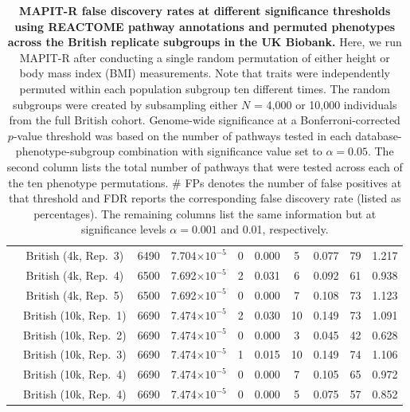\documentclass[10pt]{article}
\begin{document}
\begin{landscape}
\begin{table}[ht]
\begin{tabular}{|c|c|c|ccc|cc|cc|}
  & British (4k, Rep.~3) & 6490 & 7.704$\times 10^{-5}$ & 0 & 0.000 & 5 & 0.077 & 79 & 1.217 \\
  & British (4k, Rep.~4) & 6500 & 7.692$\times 10^{-5}$ & 2 & 0.031 & 6 & 0.092 & 61 & 0.938 \\
  & British (4k, Rep.~5) & 6500 & 7.692$\times 10^{-5}$ & 0 & 0.000 & 7 & 0.108 & 73 & 1.123 \\
  & British (10k, Rep.~1) & 6690 & 7.474$\times 10^{-5}$ & 2 & 0.030 & 10 & 0.149 & 73 & 1.091 \\
  & British (10k, Rep.~2) & 6690 & 7.474$\times 10^{-5}$ & 0 & 0.000 & 3 & 0.045 & 42 & 0.628 \\
  & British (10k, Rep.~3) & 6690 & 7.474$\times 10^{-5}$ & 1 & 0.015 & 10 & 0.149 & 74 & 1.106 \\
  & British (10k, Rep.~4) & 6690 & 7.474$\times 10^{-5}$ & 0 & 0.000 & 7 & 0.105 & 65 & 0.972 \\
  & British (10k, Rep.~4) & 6690 & 7.474$\times 10^{-5}$ & 0 & 0.000 & 5 & 0.075 & 57 & 0.852 \\
    \hline
\end{tabular}
\caption{\textbf{MAPIT-R false discovery rates at different significance thresholds using REACTOME pathway annotations and permuted phenotypes across the British replicate subgroups in the UK Biobank.} Here, we run MAPIT-R after conducting a single random permutation of either height or body mass index (BMI) measurements. Note that traits were independently permuted within each population subgroup ten different times. The random subgroups were created by subsampling either $N$ = 4,000 or 10,000 individuals from the full British cohort. Genome-wide significance at a Bonferroni-corrected $p$-value threshold was based on the number of pathways tested in each database-phenotype-subgroup combination with significance value set to $\alpha = 0.05$. The second column lists the total number of pathways that were tested across each of the ten phenotype permutations. \# FPs denotes the number of false positives at that threshold and FDR reports the corresponding false discovery rate (listed as percentages). The remaining columns list the same information but at significance levels $\alpha = 0.001$ and 0.01, respectively.}
\label{InterPath-Supp-Table-BritReps-FDRs-pt2}
\end{table}

\end{landscape}

\end{document}
